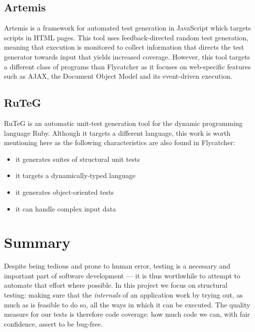\subsection{Artemis}
\textsf{Artemis} \cite{artzi2011framework} is a framework for automated test generation in JavaScript which targets scripts in HTML pages. This tool uses feedback-directed random test generation, meaning that execution is monitored to collect information that directs the test generator towards input that yields increased coverage. However, this tool targets a different class of programs than \textsf{Flycatcher} as it focuses on web-specific features such as AJAX, the Document Object Model and its event-driven execution.

\subsection{RuTeG}
\textsf{RuTeG} \cite{mairhofer2008search} is an automatic unit-test generation tool for the dynamic programming language Ruby. Although it targets a different language, this work is worth mentioning here as the following characteristics are also found in \textsf{Flycatcher}:

\begin{itemize}
   \item it generates suites of structural unit tests
   \item it targets a dynamically-typed language
   \item it generates object-oriented tests 
   \item it can handle complex input data
\end{itemize}

\section{Summary}

Despite being tedious and prone to human error, testing is a necessary and important part of software development --- it is thus worthwhile to attempt to automate that effort where possible. In this project we focus on structural testing: making sure that the \emph{internals} of an application work by trying out, as much as is feasible to do so, all the ways in which it can be executed. The quality measure for our tests is therefore code coverage: how much code we can, with fair confidence, assert to be bug-free.

